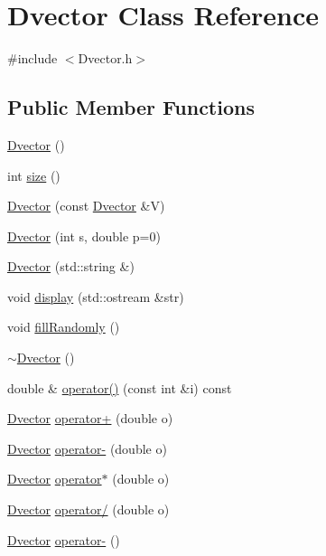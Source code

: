 \hypertarget{classDvector}{\section{Dvector Class Reference}
\label{classDvector}
}


{\ttfamily \#include $<$Dvector.\-h$>$}

\subsection*{Public Member Functions}
\begin{DoxyCompactItemize}
\item 
\hyperlink{classDvector_adf0f620df0feef3311f7d198e649a298}{Dvector} ()
\item 
int \hyperlink{classDvector_a964b4f5cc235ba6aaf9c5e437318be87}{size} ()
\item 
\hyperlink{classDvector_a6ca045c78602ab23be94e8701669a73f}{Dvector} (const \hyperlink{classDvector}{Dvector} \&V)
\item 
\hyperlink{classDvector_a5ad403c9d2c948d16a166af4e17ff34e}{Dvector} (int s, double p=0)
\item 
\hyperlink{classDvector_a75dc16ec331e444df83f54a9d313961a}{Dvector} (std\-::string \&)
\item 
void \hyperlink{classDvector_af66e4bdf60171463c01eea1039eecdb1}{display} (std\-::ostream \&str)
\item 
void \hyperlink{classDvector_a6fecdca0fbad7f928403597e322234b1}{fill\-Randomly} ()
\item 
\hyperlink{classDvector_a3156d0776c5da1a15685970200ec6b96}{$\sim$\-Dvector} ()
\item 
double \& \hyperlink{classDvector_a8c4063a0e38bec740498b132165e3ec8}{operator()} (const int \&i) const 
\item 
\hyperlink{classDvector}{Dvector} \hyperlink{classDvector_afca545bd8d0d6087863dabf7c1d73954}{operator+} (double o)
\item 
\hyperlink{classDvector}{Dvector} \hyperlink{classDvector_aab08102f4b4ffb7824ad8a90980e0eff}{operator-\/} (double o)
\item 
\hyperlink{classDvector}{Dvector} \hyperlink{classDvector_a5f346f4f33d53517f03fcbe97de08184}{operator$\ast$} (double o)
\item 
\hyperlink{classDvector}{Dvector} \hyperlink{classDvector_a60c543afd629b1759643ffe5e8d9a853}{operator/} (double o)
\item 
\hyperlink{classDvector}{Dvector} \hyperlink{classDvector_a402617afbca77199f537110a8efc0e10}{operator-\/} ()

\end{DoxyCompactItemize}

